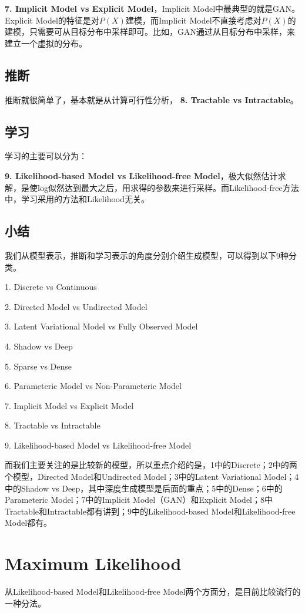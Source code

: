 \documentclass[a4paper]{article}
\begin{document}
\textbf{7. Implicit Model vs Explicit Model}，Implicit Model中最典型的就是GAN。Explicit Model的特征是对$P(X)$建模，而Implicit Model不直接考虑对$P(X)$的建模，只需要可从目标分布中采样即可。比如，GAN通过从目标分布中采样，来建立一个虚拟的分布。

\subsection{推断}
推断就很简单了，基本就是从计算可行性分析，
\textbf{8. Tractable vs Intractable}。

\subsection{学习}
学习的主要可以分为：

\textbf{9. Likelihood-based Model vs Likelihood-free Model}，极大似然估计求解，是使log似然达到最大之后，用求得的参数来进行采样。而Likelihood-free方法中，学习采用的方法和Likelihood无关。

\subsection{小结}
我们从模型表示，推断和学习表示的角度分别介绍生成模型，可以得到以下9种分类。

1. Discrete vs Continuous

2. Directed Model vs Undirected Model

3. Latent Variational Model vs Fully Observed Model

4. Shadow vs Deep

5. Sparse vs Dense

6. Parameteric Model vs Non-Parameteric Model

7. Implicit Model vs Explicit Model

8. Tractable vs Intractable

9. Likelihood-based Model vs Likelihood-free Model

而我们主要关注的是比较新的模型，所以重点介绍的是，1中的Discrete；2中的两个模型，Directed Model和Undirected Model；3中的Latent Variational Model；4中的Shadow vs Deep，其中深度生成模型是后面的重点；5中的Dense；6中的Parameteric Model；7中的Implicit Model（GAN）和Explicit Model；8中Tractable和Intractable都有讲到；9中的Likelihood-based Model和Likelihood-free Model都有。

\section{Maximum Likelihood}
从Likelihood-based Model和Likelihood-free Model两个方面分，是目前比较流行的一种分法。
\end{document}
